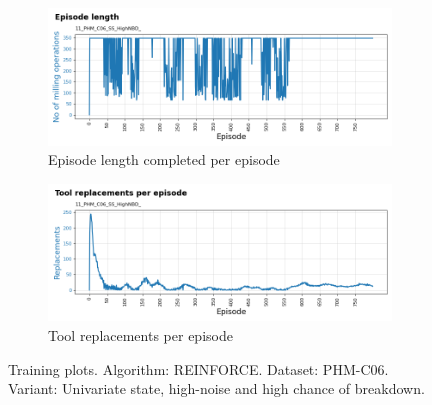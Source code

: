 \documentclass[a4paper, 12pt]{article}
\begin{document}
\begin{figure}[ht]
	\begin{subfigure}[b]{0.5\textwidth}
		\centering
		\includegraphics[width=\textwidth]{images/TrainingPlots/11_PHM_C06_SS_HighNBD__Episode_Length.png}  
		\caption{Episode length completed per episode}
		\label{fig:C06eplen}
	\end{subfigure}
	\hfill
	\begin{subfigure}[b]{0.5\textwidth}
		\centering
		\includegraphics[width=\textwidth]{images/TrainingPlots/11_PHM_C06_SS_HighNBD__Tool_Replacements.png}  
		\caption{Tool replacements per episode}
		\label{fig:C06toolrep}
	\end{subfigure} 
	\caption{Training plots. Algorithm: REINFORCE. Dataset: PHM-C06. Variant: Univariate state, high-noise and high chance of breakdown.}
	\label{fig:C06trplots}
\end{figure}
\end{document}
